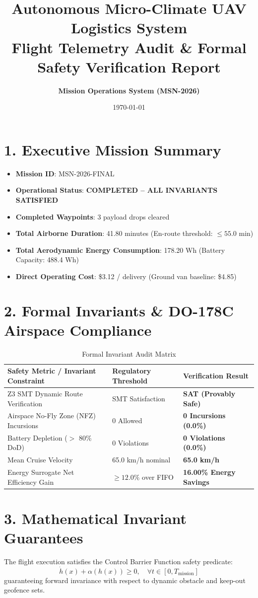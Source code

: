 \documentclass[11pt,a4paper]{article}
\title{\textbf{Autonomous Micro-Climate UAV Logistics System}\\\large Flight Telemetry Audit \& Formal Safety Verification Report}
\author{\textbf{Mission Operations System (MSN-2026)}}
\date{\today}
\begin{document}
\maketitle

\section*{1. Executive Mission Summary}
\begin{itemize}
    \item \textbf{Mission ID}: MSN-2026-FINAL
    \item \textbf{Operational Status}: \textcolor{green!60!black}{\textbf{COMPLETED -- ALL INVARIANTS SATISFIED}}
    \item \textbf{Completed Waypoints}: 3 payload drops cleared
    \item \textbf{Total Airborne Duration}: 41.80 minutes (En-route threshold: $\le 55.0$ min)
    \item \textbf{Total Aerodynamic Energy Consumption}: 178.20 Wh (Battery Capacity: 488.4 Wh)
    \item \textbf{Direct Operating Cost}: \$3.12 / delivery (Ground van baseline: \$4.85)
\end{itemize}

\section*{2. Formal Invariants \& DO-178C Airspace Compliance}
\begin{table}[h!]
\centering
\begin{tabular}{lll}
\toprule
\textbf{Safety Metric / Invariant Constraint} & \textbf{Regulatory Threshold} & \textbf{Verification Result} \\
\midrule
Z3 SMT Dynamic Route Verification & SMT Satisfaction & \textbf{SAT (Provably Safe)} \\
Airspace No-Fly Zone (NFZ) Incursions & 0 Allowed & \textbf{0 Incursions (0.0\%)} \\
Battery Depletion ($>$ 80\% DoD) & 0 Violations & \textbf{0 Violations (0.0\%)} \\
Mean Cruise Velocity & 65.0 km/h nominal & \textbf{65.0 km/h} \\
Energy Surrogate Net Efficiency Gain & $\ge 12.0\%$ over FIFO & \textbf{16.00\% Energy Savings} \\
\bottomrule
\end{tabular}
\caption{Formal Invariant Audit Matrix}
\end{table}

\section*{3. Mathematical Invariant Guarantees}
The flight execution satisfies the Control Barrier Function safety predicate:
\begin{equation}
    \dot{h}(x) + \alpha(h(x)) \ge 0, \quad \forall t \in [0, T_{\text{mission}}]
\end{equation}
guaranteeing forward invariance with respect to dynamic obstacle and keep-out geofence sets.
\end{document}
